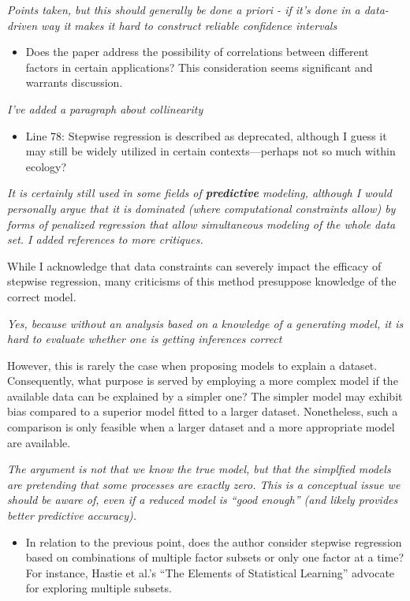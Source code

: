 \documentclass[12pt]{article}
\providecommand{\tightlist}{%
  \setlength{\itemsep}{0pt}\setlength{\parskip}{0pt}}
\begin{document}
\emph{Points taken, but this should generally be done a priori - if it's
done in a data-driven way it makes it hard to construct reliable
confidence intervals}

\begin{itemize}
\tightlist
\item
  Does the paper address the possibility of correlations between
  diﬀerent factors in certain applications? This consideration seems
  signiﬁcant and warrants discussion.
\end{itemize}

\emph{I've added a paragraph about collinearity}

\begin{itemize}
\tightlist
\item
  Line 78: Stepwise regression is described as deprecated, although I
  guess it may still be widely utilized in certain contexts---perhaps
  not so much within ecology?
\end{itemize}

\emph{It is certainly still used in some fields of \textbf{predictive}
modeling, although I would personally argue that it is dominated (where
computational constraints allow) by forms of penalized regression that
allow simultaneous modeling of the whole data set. I added references to
more critiques.}

While I acknowledge that data constraints can severely impact the eﬃcacy
of stepwise regression, many criticisms of this method presuppose
knowledge of the correct model.

\emph{Yes, because without an analysis based on a knowledge of a
generating model, it is hard to evaluate whether one is getting
inferences correct}

However, this is rarely the case when proposing models to explain a
dataset. Consequently, what purpose is served by employing a more
complex model if the available data can be explained by a simpler one?
The simpler model may exhibit bias compared to a superior model ﬁtted to
a larger dataset. Nonetheless, such a comparison is only feasible when a
larger dataset and a more appropriate model are available.

\emph{The argument is not that we know the true model, but that the
simplfied models are pretending that some processes are exactly zero.
This is a conceptual issue we should be aware of, even if a reduced
model is ``good enough'' (and likely provides better predictive
accuracy).}

\begin{itemize}
\tightlist
\item
  In relation to the previous point, does the author consider stepwise
  regression based on combinations of multiple factor subsets or only
  one factor at a time? For instance, Hastie et al.'s ``The Elements of
  Statistical Learning'' advocate for exploring multiple subsets.
\end{itemize}
\end{document}
